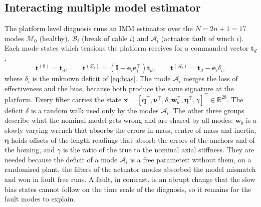 \documentclass{interact}
\newcommand{\vc}[1]{\bm{#1}}
\newcommand{\mt}[1]{\mathbf{#1}}
\newcommand{\eye}{\mt{I}}
\begin{document}
\subsection{Interacting multiple model estimator}\label{sec:imm}

The platform level diagnosis runs an IMM estimator \citep{blom1988imm} over the $N=2n+1=17$ modes $\mathcal M_0$ (healthy), $\mathcal B_i$ (break of cable $i$) and $\mathcal A_i$ (actuator fault of winch $i$). Each mode states which tensions the platform receives for a commanded vector $\vc t_d$,
\begin{equation}\label{eq:modes}
\vc t^{(0)}=\vc t_d,\qquad \vc t^{(\mathcal B_i)}=(\eye-\vc e_i\vc e_i^\top)\vc t_d,\qquad \vc t^{(\mathcal A_i)}=\vc t_d-\vc e_i\delta_i,
\end{equation}
where $\delta_i$ is the unknown deficit of \eqref{eq:bias}. The mode $\mathcal A_i$ merges the loss of effectiveness and the bias, because both produce the same signature at the platform. Every filter carries the state $\vc x=[\vc q^\top,\vc\nu^\top,\delta,\vc w_b^\top,\vc\eta^\top,\gamma]^\top\in\mathbb R^{28}$. The deficit $\delta$ is a random walk used only by the modes $\mathcal A_i$. The other three groups describe what the nominal model gets wrong and are shared by all modes: $\vc w_b$ is a slowly varying wrench that absorbs the errors in mass, centre of mass and inertia, $\vc\eta$ holds offsets of the length readings that absorb the errors of the anchors and of the homing, and $\gamma$ is the ratio of the true to the nominal axial stiffness. They are needed because the deficit of a mode $\mathcal A_i$ is a free parameter: without them, on a randomised plant, the filters of the actuator modes absorbed the model mismatch and won in fault free runs. A fault, in contrast, is an abrupt change that the slow bias states cannot follow on the time scale of the diagnosis, so it remains for the fault modes to explain.
\end{document}
